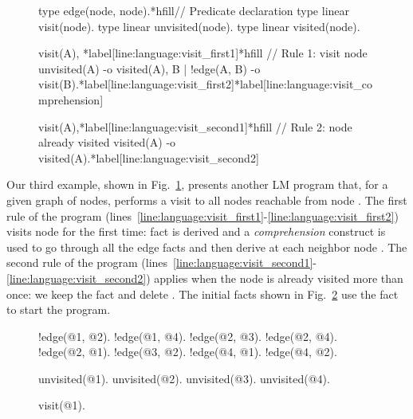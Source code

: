 
\begin{figure}[h!]
\begin{LineCode}[commandchars=\*\[\]]
type edge(node, node).*hfill// Predicate declaration
type linear visit(node).
type linear unvisited(node).
type linear visited(node).

visit(A), *label[line:language:visit_first1]*hfill // Rule 1: visit node
unvisited(A) -o
   visited(A),
   {B | !edge(A, B) -o visit(B)}.*label[line:language:visit_first2]*label[line:language:visit_comprehension]

visit(A),*label[line:language:visit_second1]*hfill // Rule 2: node already visited
visited(A)
   -o visited(A).*label[line:language:visit_second2]
\end{LineCode}
  \label{code:language:visit}
\end{figure}

Our third example, shown in Fig.~\ref{code:language:visit}, presents another LM
program that, for a given graph of nodes, performs a visit to all nodes
reachable from node . The first rule of the program
(lines~\ref{line:language:visit_first1}-\ref{line:language:visit_first2}) visits
node  for the first time: fact  is derived and a
\emph{comprehension} construct is used to go through all the edge facts and then
derive  at each neighbor node . The second rule of the
program
(lines~\ref{line:language:visit_second1}-\ref{line:language:visit_second2})
applies when the node is already visited more than once: we keep the
 fact and delete . The initial facts shown in
Fig.~\ref{code:language:visit_initial} use the  fact to start
the program.

\begin{figure}[h!]
\begin{LineCode}[commandchars=\*\[\]]
!edge(@1, @2).
!edge(@1, @4).
!edge(@2, @3).
!edge(@2, @4).
!edge(@2, @1).
!edge(@3, @2).
!edge(@4, @1).
!edge(@4, @2).

unvisited(@1).
unvisited(@2).
unvisited(@3).
unvisited(@4).

visit(@1).
\end{LineCode}
  \label{code:language:visit_initial}
\end{figure}

